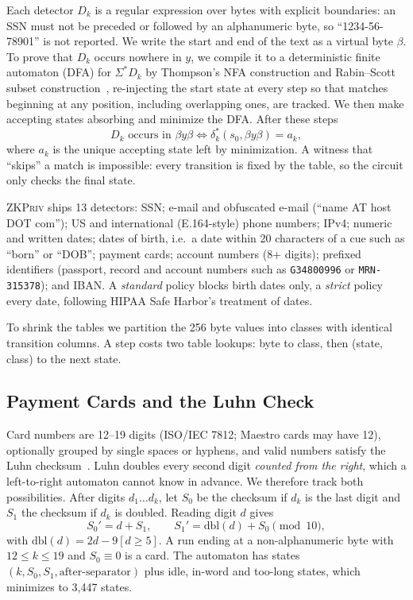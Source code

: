\documentclass[conference]{IEEEtran}
\newcommand{\sys}{\textsc{ZKPriv}}
\begin{document}
Each detector $D_k$ is a regular expression over bytes with explicit boundaries: an SSN must not be preceded or followed by an alphanumeric byte, so ``1234-56-78901'' is not reported. We write the start and end of the text as a virtual byte $\beta$. To prove that $D_k$ occurs nowhere in $y$, we compile it to a deterministic finite automaton (DFA) for $\Sigma^\ast D_k$ by Thompson's NFA construction and Rabin--Scott subset construction~\cite{hopcroft_ullman}, re-injecting the start state at every step so that matches beginning at any position, including overlapping ones, are tracked. We then make accepting states absorbing and minimize the DFA. After these steps
\begin{equation}
  D_k \text{ occurs in } \beta y \beta
  \iff \delta_k^\ast(s_0, \beta y \beta) = a_k,
  \label{eq:dfa}
\end{equation}
where $a_k$ is the unique accepting state left by minimization. A witness that ``skips'' a match is impossible: every transition is fixed by the table, so the circuit only checks the final state.

\sys{} ships 13 detectors: SSN; e-mail and obfuscated e-mail (``name AT host DOT com''); US and international (E.164-style) phone numbers; IPv4; numeric and written dates; dates of birth, i.e.\ a date within 20 characters of a cue such as ``born'' or ``DOB''; payment cards; account numbers (8+ digits); prefixed identifiers (passport, record and account numbers such as \texttt{G34800996} or \texttt{MRN-315378}); and IBAN. A \emph{standard} policy blocks birth dates only, a \emph{strict} policy every date, following HIPAA Safe Harbor's treatment of dates.

To shrink the tables we partition the 256 byte values into classes with identical transition columns. A step costs two table lookups: byte to class, then (state, class) to the next state.

\subsection{Payment Cards and the Luhn Check}

Card numbers are 12--19 digits (ISO/IEC 7812; Maestro cards may have 12), optionally grouped by single spaces or hyphens, and valid numbers satisfy the Luhn checksum~\cite{luhn}. Luhn doubles every second digit \emph{counted from the right}, which a left-to-right automaton cannot know in advance. We therefore track both possibilities. After digits $d_1\dots d_k$, let $S_0$ be the checksum if $d_k$ is the last digit and $S_1$ the checksum if $d_k$ is doubled. Reading digit $d$ gives
\begin{equation}
  S_0' = d + S_1,\qquad S_1' = \mathrm{dbl}(d) + S_0 \pmod{10},
  \label{eq:luhn}
\end{equation}
with $\mathrm{dbl}(d) = 2d - 9[d \ge 5]$. A run ending at a non-alphanumeric byte with $12 \le k \le 19$ and $S_0 \equiv 0$ is a card. The automaton has states $(k, S_0, S_1, \text{after-separator})$ plus idle, in-word and too-long states, which minimizes to 3,447 states.
\end{document}
